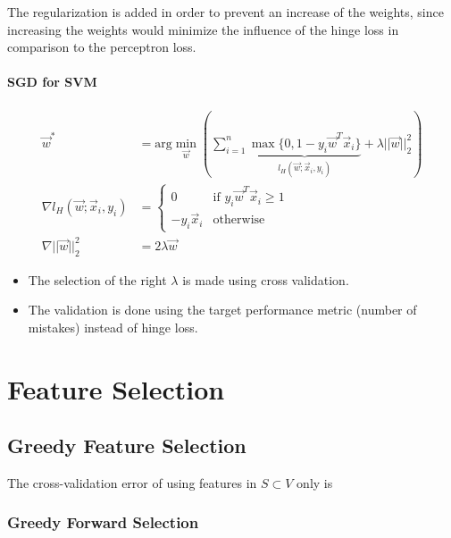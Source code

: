 \documentclass[10pt,a4paper]{scrartcl}
\newcommand{\Argmin}[2]{\text{arg}\underset{#1}{\min}\left(#2\right)}
\begin{document}
\begin{multicols*}{2}
The regularization is added in order to prevent an increase of the weights, since increasing the weights would minimize the influence of the hinge loss in comparison to the perceptron loss.

\paragraph{SGD for SVM}

\begin{align*}
\vec{w}^\ast&=\Argmin{\vec{w}}{\sum\limits_{i=1}^n\underbrace{\max\{0,1-y_i\vec{w}^T\vec{x}_i\}}_{l_H(\vec{w};\vec{x}_i,y_i)}+\lambda||\vec{w}||_2^2}\\
\nabla l_H(\vec{w};\vec{x}_i,y_i)&=\begin{cases}0& \text{if } y_i\vec{w}^T\vec{x}_i\geq 1\\-y_i\vec{x}_i&\text{otherwise}\end{cases}\\
\nabla||\vec{w}||_2^2 &= 2\lambda\vec{w}
\end{align*}


\begin{itemize}
\item The selection of the right $\lambda$ is made using cross validation.
\item The validation is done using the target performance metric (number of mistakes) instead of hinge loss.
\end{itemize}

\section{Feature Selection}

\subsection{Greedy Feature Selection}


The cross-validation error of using features in $S\subset V$ only is


\subsubsection{Greedy Forward Selection}


\end{multicols*}
\end{document}
